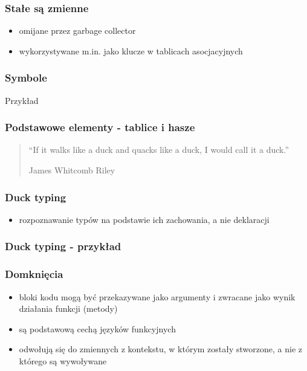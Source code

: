 \documentclass[12t]{beamer}
\begin{document}
\begin{frame}[fragile]
  \frametitle{Stałe są zmienne}
  
\end{frame}

\begin{frame}[fragile]
  \begin{itemize}
  \item omijane przez garbage collector
  \item wykorzystywane m.in. jako klucze w tablicach asocjacyjnych
  \end{itemize}
  \frametitle{Symbole}
  \begin{block}{Przykład}
    
  \end{block}
\end{frame}

\begin{frame}[fragile]
  \frametitle{Podstawowe elementy - tablice i hasze}
  
\end{frame}

\begin{frame}
  \begin{quote}
    “If it walks like a duck and quacks like a duck, I would call it a
    duck.”

    \hfill James Whitcomb Riley
  \end{quote}
\end{frame}

\begin{frame}
  \frametitle{Duck typing}
  \begin{itemize}
  \item rozpoznawanie typów na podstawie ich zachowania, a nie deklaracji
  \end{itemize}
\end{frame}

\begin{frame}
  \frametitle{Duck typing - przykład}
 \begin{footnotesize}
    
  \end{footnotesize}
\end{frame}

\begin{frame}
  \frametitle{Domknięcia}
  \begin{itemize}
  \item bloki kodu mogą być przekazywane jako argumenty i zwracane
    jako wynik działania funkcji (metody)
  \item są podstawową cechą języków funkcyjnych
  \item odwołują się do zmiennych z kontekstu, w którym zostały
    stworzone, a nie z którego są wywoływane
  \end{itemize}
\end{frame}
\end{document}
